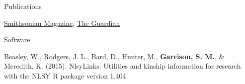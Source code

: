 \documentclass {resume}
\newcommand{\R}{\textup{\textrm{R}}\xspace}
\newcommand{\meb}{{\bf Garrison, S. M.}\xspace}
\newlength{\wideitemsep}
\let\olditem\item
\renewcommand{\item}{\setlength{\itemsep}{\wideitemsep}\olditem}
\begin{document}
\begin{rSection}{\textrm{Publications}}
\begin{etaremune}
{%
\href{http://www.smithsonianmag.com/science-nature/how-long-will-you-live-ask-your-friends-180954201/?no-ist}{Smithsonian Magazine},
\href{http://www.theguardian.com/commentisfree/oliver-burkeman-column/2015/jan/27/your-friends-know-more-about-your-life-than-you-do-including-when-you-might-die}{The Guardian}
}
\end{etaremune}\end{rSection}\vspace{-4mm}

\begin{rSection}{\textrm{Software}}%
\begin{etaremune}\item  Beasley, W., Rodgers, J. L., Bard, D., Hunter, M., \meb, \& Meredith, K. (2015). NlsyLinks: Utilities and kinship information for research with the NLSY \R package version 1.404 \href{http://liveoak.github.io/NlsyLinks}{\color{blue}{http://liveoak.github.io/NlsyLinks}}\end{etaremune}\end{rSection}\pagebreak
\end{document}
